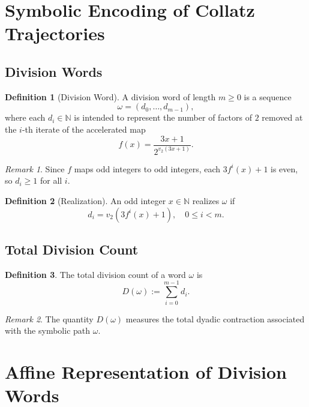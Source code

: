 \documentclass[12pt, oneside]{article}
\numberwithin{equation}{section}
\theoremstyle{definition}
\newtheorem{definition}{Definition}[section]
\theoremstyle{plain}
\theoremstyle{remark}
\newtheorem*{remark}{Remark}
\begin{document}
\section{Symbolic Encoding of Collatz Trajectories}
\label{sec:division-counts}

\subsection{Division Words}

\begin{definition}[Division Word]
A division word of length $m \ge 0$ is a sequence
\[
\omega = (d_0, \dots, d_{m-1}),
\]
where each $d_i \in \mathbb{N}$ is intended to represent the number of factors of $2$
removed at the $i$-th iterate of the accelerated map
\[
f(x) = \frac{3x+1}{2^{v_2(3x+1)}}.
\]
\end{definition}

\begin{remark}
Since $f$ maps odd integers to odd integers, each $3f^i(x)+1$ is even,
so $d_i \ge 1$ for all $i$.
\end{remark}

\begin{definition}[Realization]
An odd integer $x \in \mathbb{N}$ realizes $\omega$ if
\[
d_i = v_2(3f^i(x)+1), \quad 0 \le i < m.
\]
\end{definition}

\subsection{Total Division Count}

\begin{definition}
The total division count of a word $\omega$ is
\[
D(\omega) := \sum_{i=0}^{m-1} d_i.
\]
\end{definition}

\begin{remark}
The quantity $D(\omega)$ measures the total dyadic contraction
associated with the symbolic path $\omega$.
\end{remark}

\section{Affine Representation of Division Words}
\label{sec:affine-representation}
\end{document}
